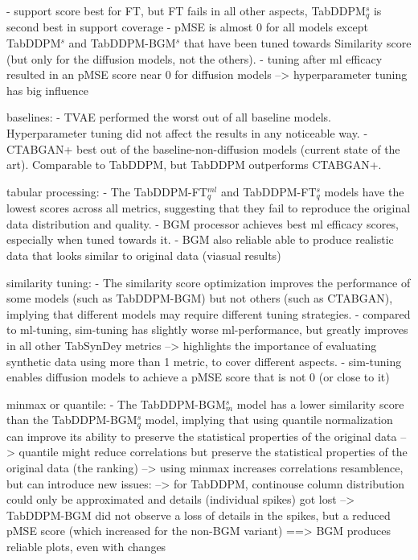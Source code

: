 - support score best for FT, but FT fails in all other aspects, TabDDPM$^{s}_q$ is second best in support coverage 
- pMSE is almost 0 for all models except TabDDPM$^{s}$ and TabDDPM-BGM$^{s}$  that have been tuned towards Similarity score (but only for the diffusion models, not the others).
	- tuning after ml efficacy resulted in an pMSE score near 0 for diffusion models --> hyperparameter tuning has big influence


baselines:
- TVAE performed the worst out of all baseline models. Hyperparameter tuning did not affect the results in any noticeable way.
- CTABGAN+ best out of the baseline-non-diffusion models (current state of the art). Comparable to TabDDPM, but TabDDPM outperforms CTABGAN+.


tabular processing:
- The TabDDPM-FT$^{ml}_q$ and TabDDPM-FT$^{s}_q$ models have the lowest scores across all metrics, suggesting that they fail to reproduce the original data distribution and quality.
- BGM processor achieves best ml efficacy scores, especially when tuned towards it.
- BGM also reliable able to produce realistic data that looks similar to original data (viasual results)


similarity tuning:
- The similarity score optimization improves the performance of some models (such as TabDDPM-BGM) but not others (such as CTABGAN), implying that different models may require different tuning strategies.
- compared to ml-tuning, sim-tuning has slightly worse ml-performance, but greatly improves in all other TabSynDey metrics --> highlights the importance of evaluating synthetic data using more than 1 metric, to cover different aspects.
- sim-tuning enables diffusion models to achieve a pMSE score that is not 0 (or close to it) 


minmax or quantile:
- The TabDDPM-BGM$^{s}_m$ model has a lower similarity score than the TabDDPM-BGM$^{s}_q$ model, implying that using quantile normalization can improve its ability to preserve the statistical properties of the original data
--> quantile might reduce correlations but preserve the statistical properties of the original data (the ranking)
--> using minmax increases correlations resamblence, but can introduce new issues:
	--> for TabDDPM, continouse column distribution could only be approximated and details (individual spikes) got lost
	--> TabDDPM-BGM did not observe a loss of details in the spikes, but a reduced pMSE score (which increased for the non-BGM variant)
	==> BGM produces reliable plots, even with changes

